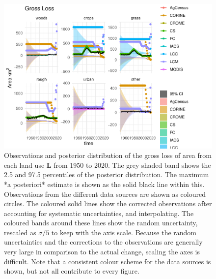 \documentclass[
]{book}
\begin{document}
\begin{figure}
\includegraphics[width=1.3\linewidth]{Results_sc_files/figure-latex/plotL-1} \caption{ Observations and posterior distribution of the gross loss of area from each land use $\mathbf{L}$ from 1950 to 2020.  The grey shaded band shows the 2.5 and 97.5 percentiles of the posterior distribution. The maximum *a posteriori* estimate is shown as the solid black line within this. Observations from the different data sources are shown as coloured circles. The coloured solid lines show the corrected observations after accounting for systematic uncertainties, and interpolating. The coloured bands around these lines show the random uncertainty, rescaled as $\sigma /5$ to keep with the axis scale. Because the random uncertainties and the corrections to the observations are generally very large in comparison to the actual change, scaling the axes is difficult. Note that a consistent colour scheme for the data sources is shown, but not all contribute to every figure.}\label{fig:plotL}
\end{figure}
\end{document}
